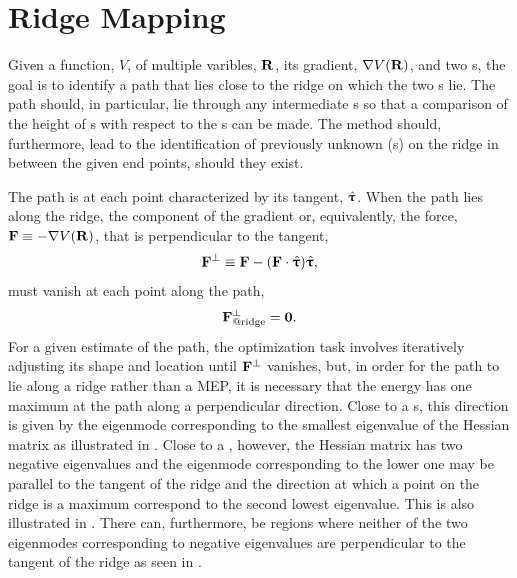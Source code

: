 \section{Ridge Mapping}
\label{sec:ridge-mapping}

Given a function, $V$, of multiple varibles, ${\mathrm{\mathbf{\bm{R}}}}$, its gradient, $\nabla V({\mathrm{\mathbf{\bm{R}}}})$, and two s, the goal is to identify a path that lies close to the ridge on which the two s lie.
The path should, in particular, lie through any intermediate s so that a comparison of the height of s with respect to the s can be made.
The method should, furthermore, lead to the identification of previously unknown (s) on the ridge in between the given end points, should they exist.

\okay

The path is at each point characterized by its tangent, $\hat{{\mathrm{\mathbf{\bm{\uptau}}}}}$.
When the path lies along the ridge, the component of the gradient or, equivalently, the force, ${\mathrm{\mathbf{\bm{F}}}} \equiv -\nabla V({\mathrm{\mathbf{\bm{R}}}})$, that is perpendicular to the tangent,
\begin{equation}
   {\ensuremath{\mathrm{\mathbf{\bm{F}}}}}^\perp \equiv {\ensuremath{\mathrm{\mathbf{\bm{F}}}}} - ({\mathrm{\mathbf{\bm{F}}}} \cdot \hat{{\mathrm{\mathbf{\bm{\uptau}}}}})\hat{{\mathrm{\mathbf{\bm{\uptau}}}}},
\label{eq:perpendicular-force}
\end{equation}
must vanish at each point along the path,
\begin{equation}
   {\ensuremath{\mathrm{\mathbf{\bm{F}}}}}^\perp_\text{@ridge} = \textbf{0}.
\label{eq:ridge-force-criterion}
\end{equation}
For a given estimate of the path, the optimization task involves iteratively adjusting its shape and location until ${\mathrm{\mathbf{\bm{F}}}}^\perp$ vanishes,
but, in order for the path to lie along a ridge rather than a MEP, it is necessary that the energy has one maximum at the path along a perpendicular direction.
Close to a s, this direction is given by the eigenmode corresponding to the smallest eigenvalue of the Hessian matrix as illustrated in .
Close to a , however, the Hessian matrix has two negative eigenvalues and the eigenmode corresponding to the lower one may be parallel to the tangent of the ridge and the direction at which a point on the ridge is a maximum correspond to the second lowest eigenvalue.
This is also illustrated in .
There can, furthermore, be regions where neither of the two eigenmodes corresponding to negative eigenvalues are perpendicular to the tangent of the ridge as seen in .

